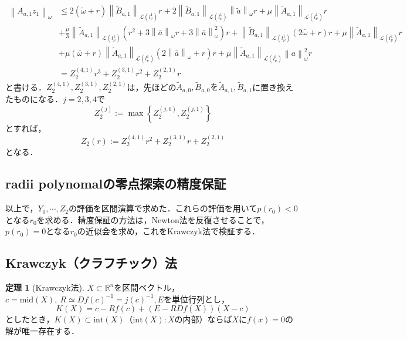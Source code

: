 \documentclass[11pt,a4paper]{jsarticle}
\theoremstyle{definition}
\newtheorem{thm}{定理}
\begin{document}
\begin{equation*}
  \begin{split}
    \left\| A_{a,1} z_1 \right\|_{\omega} &\leq 2\left(\tilde{\omega} + r\right) \left\| \tilde{B}_{a,1} \right\|_{\mathcal{L}\left(l_{\nu}^1\right)} r + 2 \left\| \tilde{B}_{a,1} \right\|_{\mathcal{L}\left(l_{\nu}^1\right)} \left\| \tilde{a} \right\|_\omega r + \mu \left\| \tilde{A}_{a,1} \right\|_{\mathcal{L}\left(l_{\nu}^1\right)} r \\
    &+ \frac{\mu}{3} \left\| \tilde{A}_{a,1} \right\|_{\mathcal{L}\left(l_{\nu}^1\right)} \left( r^2 + 3 \left\| \bar{a} \right\|_\omega r + 3 \left\| \bar{a} \right\|^2_\omega \right) r + \left\| \tilde{B}_{a,1} \right\|_{\mathcal{L}\left(l_{\nu}^1\right)} \left( 2\bar{\omega} + r\right)r + \mu \left\| \tilde{A}_{a,1} \right\|_{\mathcal{L}\left(l_{\nu}^1\right)} r \\
    &+ \mu\left(\bar{\omega}+r\right)\left\| \tilde{A}_{a,1} \right\|_{\mathcal{L}\left(l_{\nu}^1\right)} \left( 2 \left\| \bar{a} \right\|_{\omega} + r\right)r + \mu \left\| \tilde{A}_{a,1} \right\|_{\mathcal{L}\left(l_{\nu}^1\right)} \left\| a \right\|_\omega^2 r\\
    &= Z_2^{(4,1)} r^3 + Z_2^{(3,1)} r^2 + Z_2^{(2,1)} r
  \end{split}
\end{equation*}
と書ける．$Z_2^{(4,1)},Z_2^{(3,1)},Z_2^{(2,1)}$は，先ほどの$\tilde{A}_{a,0},\tilde{B}_{a,0}を\tilde{A}_{a,1},\tilde{B}_{a,1}$に置き換えたものになる．$j=2,3,4$で
\begin{equation*}
  Z_2^{(j)} := \max \left\{ Z_2^{(j,0)}, Z_2^{(j,1)} \right\}
\end{equation*}
とすれば，
\begin{equation*}
  Z_2(r) := Z_2^{(4,1)} r^2 + Z_2^{(3,1)} r + Z_2^{(2,1)}
\end{equation*}
となる．

\subsection{radii polynomalの零点探索の精度保証}
以上で，$Y_0,\cdots,Z_2$の評価を区間演算で求めた．これらの評価を用いて$p(r_0)<0$となる$r_0$を求める．精度保証の方法は，Newton法を反復させることで，$p(r_0)=0$となる$r_0$の近似会を求め，これをKrawczyk法で検証する．

\subsection{Krawczyk（クラフチック）法}
\begin{thm}[Krawczyk法\cite{}]
  $X \subset \mathbb{R}^n$を区間ベクトル，$c=\mathrm{mid}(X),\ R\simeq Df(c)^{-1} = j(c)^{-1}, E$を単位行列とし，
  \begin{equation*}
    K(X) = c- Rf(c) + (E-RDf(X))(X-c)
  \end{equation*}
  としたとき，$K(X) \subset \mathrm{int}(X)$（$\mathrm{int}(X):X$の内部）ならば$Xにf(x)=0$の解が唯一存在する．
\end{thm}
\end{document}
